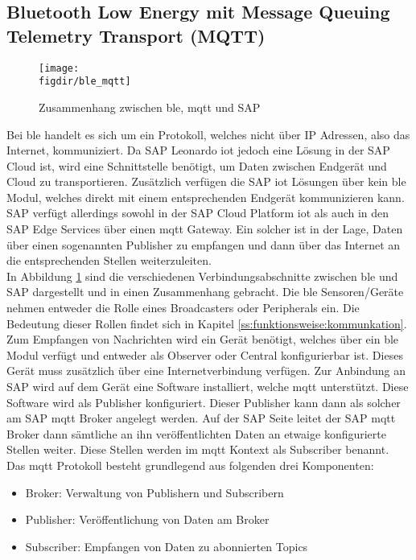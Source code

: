 \subsection{Bluetooth Low Energy mit Message Queuing Telemetry Transport (MQTT)}
\label{ss:interface:ble}

\begin{figure}[!b]
	\centering
	\texttt{[image: \\figdir/ble\_mqtt]}
	\caption{Zusammenhang zwischen \ac{ble}, \ac{mqtt} und SAP \cite[Seite 3f]{Zivkovic20:MQTT} \cite[Seite 230f]{Holtschulte20:IOS}}
	\label{FIG:mqtt}
\end{figure}

\noindent Bei \ac{ble} handelt es sich um ein Protokoll, welches nicht über IP Adressen, also das Internet, kommuniziert. Da SAP Leonardo \ac{iot} jedoch eine Lösung in der SAP Cloud ist, wird eine Schnittstelle benötigt, um Daten zwischen Endgerät und Cloud zu transportieren. Zusätzlich verfügen die SAP \ac{iot} Lösungen über kein \ac{ble} Modul, welches direkt mit einem entsprechenden Endgerät kommunizieren kann. SAP verfügt allerdings sowohl in der SAP Cloud Platform \ac{iot} als auch in den SAP Edge Services über einen \ac{mqtt} Gateway. Ein solcher ist in der Lage, Daten über einen sogenannten Publisher zu empfangen und dann über das Internet an die entsprechenden Stellen weiterzuleiten.\\
\noindent In Abbildung \ref{FIG:mqtt} sind die verschiedenen Verbindungsabschnitte zwischen \ac{ble} und SAP dargestellt und in einen Zusammenhang gebracht. Die \ac{ble} Sensoren/Geräte nehmen entweder die Rolle eines Broadcasters oder Peripherals ein. Die Bedeutung dieser Rollen findet sich in Kapitel \ref{ss:funktionsweise:kommunkation}. Zum Empfangen von Nachrichten wird ein Gerät benötigt, welches über ein \ac{ble} Modul verfügt und entweder als Observer oder Central konfigurierbar ist. Dieses Gerät muss zusätzlich über eine Internetverbindung verfügen. Zur Anbindung an SAP wird auf dem Gerät eine Software installiert, welche \ac{mqtt} unterstützt. Diese Software wird als Publisher konfiguriert. Dieser Publisher kann dann als solcher am SAP \ac{mqtt} Broker angelegt werden. Auf der SAP Seite leitet der SAP \ac{mqtt} Broker dann sämtliche an ihn veröffentlichten Daten an etwaige konfigurierte Stellen weiter. Diese Stellen werden im \ac{mqtt} Kontext als Subscriber benannt.\\
\noindent Das \ac{mqtt} Protokoll besteht grundlegend aus folgenden drei Komponenten:
\begin{itemize}
	\setlength{\itemsep}{1pt}
	\item{Broker: Verwaltung von Publishern und Subscribern}
	\item{Publisher: Veröffentlichung von Daten am Broker}
	\item{Subscriber: Empfangen von Daten zu abonnierten Topics}
\end{itemize}
